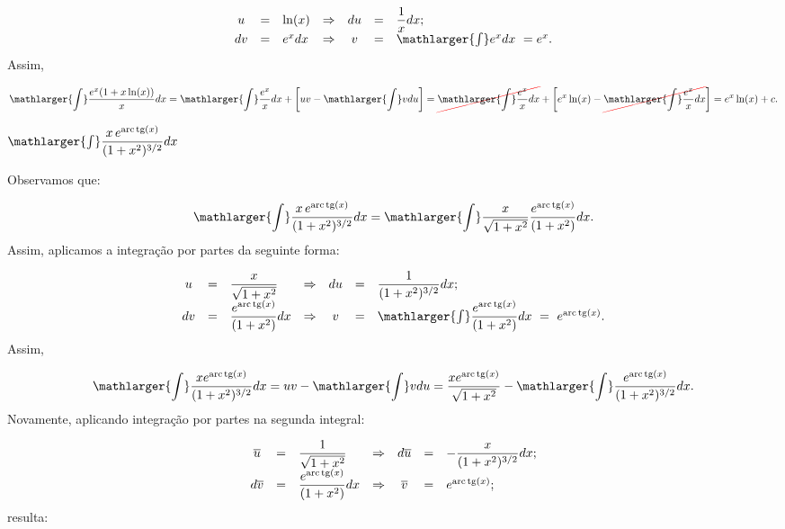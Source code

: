 \cleardoublepage\documentclass[../main.tex]{subfiles}
\begin{document}
\begin{exeresol}
\begin{compactenum}[a)]
\begin{solution}
\[ \begin{array}{cclcccl} u &=& \ln (x)&\Rightarrow&du &=& \dfrac{1}{x}dx;\\ dv &=& e^x dx &\Rightarrow&v &=& \mathlarger{\int} e^x dx \,\, =e^x. \end{array} \]
Assim,

\[ \mathlarger{\int}\dfrac{e^x(1+x\ln (x))}{x} dx=\mathlarger{\int}\dfrac{e^x}{x} dx + \left[ uv-\mathlarger{\int} vdu \right]= \Ccancel[red]{\mathlarger{\int}\dfrac{e^x}{x} dx} + \left[e^x \ln (x) - \Ccancel[red]{\mathlarger{\int}\dfrac{e^x}{x} dx} \right] = e^x \ln (x) +c. \]
 \end{solution}
 \item \( \mathlarger{\int}\dfrac{x\,e^{{\rm arc\,tg} (x)}}{(1+x^2)^{3/2}} dx\)\\
 
 \begin{solution}
 Observamos que:

\[ \mathlarger{\int}\dfrac{x\,e^{{\rm arc\,tg} (x)}}{(1+x^2)^{3/2}} dx = \mathlarger{\int}\dfrac{x}{\sqrt{1+x^2}} \dfrac{e^{{\rm arc\,tg} (x)}}{(1+x^2)} dx. \]
Assim, aplicamos a integração por partes da seguinte forma:

\[ \begin{array}{cclcccl} u &=& \dfrac{x}{\sqrt{1+x^2}}&\Rightarrow&du &=& \dfrac{1}{(1+x^2)^{3/2}}dx;\\ dv &=& \dfrac{e^{{\rm arc\,tg} (x)}}{(1+x^2)} dx&\Rightarrow&v &=& \mathlarger{\int} \dfrac{e^{{\rm arc\,tg} (x)}}{(1+x^2)} dx \,\, =\,\,e^{{\rm arc\,tg} (x)}. \end{array} \]
Assim,

\[ \mathlarger{\int}\dfrac{xe^{{\rm arc\,tg} (x)}}{(1+x^2)^{3/2}} dx= uv-\mathlarger{\int} v du =\dfrac{x e^{{\rm arc\,tg} (x)}}{\sqrt{1+x^2}}- \mathlarger{\int}\dfrac{e^{{\rm arc\,tg} (x)}}{(1+x^2)^{3/2}} dx. \]
Novamente, aplicando integração por partes na segunda integral:

\[ \begin{array}{cclcccl} \overline{u} &=& \dfrac{1}{\sqrt{1+x^2}}&\Rightarrow&d \overline{u} &=& -\dfrac{x}{(1+x^2)^{3/2}}dx;\\ d\overline{v} &=& \dfrac{e^{{\rm arc\,tg} (x)}}{(1+x^2)} dx&\Rightarrow& \overline{v} &=& e^{{\rm arc\,tg} (x)}; \end{array} \]
resulta:


\end{solution}
\end{compactenum}
\end{exeresol}
\end{document}
